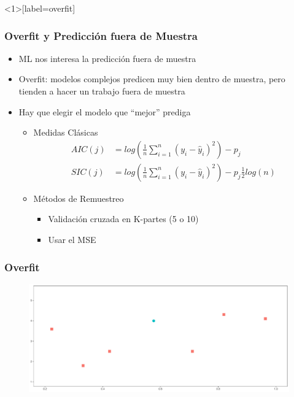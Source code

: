 \documentclass[
  shownotes,
  xcolor={svgnames},
  hyperref={colorlinks,citecolor=DarkBlue,linkcolor=DarkRed,urlcolor=DarkBlue}
  , aspectratio=169]{beamer}
\begin{document}
\begin{frame}<1>[label=overfit]
\frametitle{Overfit y Predicción fuera de Muestra}


\begin{itemize}
  \item ML nos interesa la predicción fuera de muestra
  \medskip
  \item Overfit: modelos complejos predicen muy bien dentro de muestra, pero tienden a hacer un trabajo fuera de muestra 
  \pause
  \medskip
  \item Hay que elegir el modelo que ``mejor'' prediga
  \medskip

    \begin{itemize}
    \item Medidas Clásicas
      \scriptsize
      \begin{align}
      AIC(j) &= log \left( \frac{1}{n} \sum_{i=1}^n (y_i - \hat{y}_i )^2\right)- p_j \\
      SIC(j) &= log \left( \frac{1}{n} \sum_{i=1}^n (y_i - \hat{y}_i )^2\right) -  p_j \frac{1}{2} log(n)
      \end{align}

    \item Métodos de Remuestreo
      \begin{itemize}
      \item Validación cruzada en K-partes (5 o 10)
      \item Usar el MSE
      \end{itemize}
    \end{itemize}

\end{itemize}

\end{frame}
\begin{frame}
\frametitle{Overfit}


        \begin{figure}[H] \centering
            \captionsetup{justification=centering}
              \includegraphics[scale=0.4]{figures/fig_1g.pdf}
 \end{figure}

\end{frame}
\end{document}

